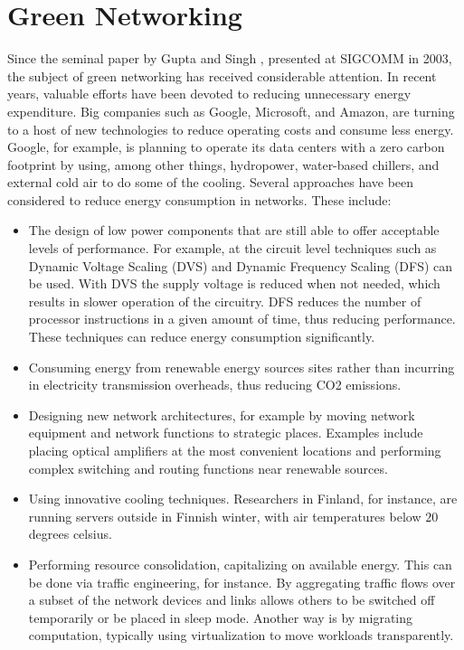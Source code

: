 \section{Green Networking}

Since the seminal paper by Gupta and Singh \cite{Gupta:2003:GI:863955.863959}, presented at SIGCOMM in 2003, the subject of green networking has received considerable attention. 
In recent years, valuable efforts have been devoted to reducing unnecessary energy expenditure.
Big companies such as Google, Microsoft, and Amazon, are turning to a host of new technologies to reduce operating costs and consume less energy.
Google, for example, is planning to operate its data centers with a zero carbon footprint by using, among other things, hydropower, water-based chillers, and external cold air to do some of the cooling.
Several approaches have been considered to reduce energy consumption in networks. These include:
\begin{itemize}
	\item The design of low power components that are still able to offer acceptable levels of performance. 
	For example, at the circuit level techniques such as Dynamic Voltage Scaling (DVS) and Dynamic Frequency Scaling (DFS) can be used. 
	With DVS the supply voltage is reduced when not needed, which results in slower operation of the circuitry. 
	DFS reduces the number of processor instructions in a given amount of time, thus reducing performance. 
	These techniques can reduce energy consumption significantly. 
	
	\item Consuming energy from renewable energy sources sites rather than incurring in electricity transmission overheads, thus reducing CO2 emissions.
	
	\item Designing new network architectures, for example by moving network equipment and network functions to strategic places. 
	Examples include placing optical amplifiers at the most convenient locations and performing complex switching and routing functions near renewable sources.
	
	\item Using innovative cooling techniques. Researchers in Finland, for instance, are running servers outside in Finnish winter, with air temperatures below $20$ degrees celsius.
	
	\item Performing resource consolidation, capitalizing on available energy. 
	This can be done via traffic engineering, for instance. 
	By aggregating traffic flows over a subset of the network devices and links allows others to be switched off temporarily or be placed in sleep mode. 
	Another way is by migrating computation, typically using virtualization to move workloads transparently.
	
\end{itemize}
